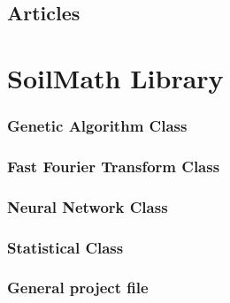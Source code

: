 \documentclass[11pt,fleqn]{book} %
\begin{document}
\section*{Articles}
\printbibliography[heading=bibempty,type=article]


\cleardoublepage
{}
\setlength{\columnsep}{0.75cm}
\printindex


\newpage
\onecolumn
\appendix
\chapter{SoilMath Library}
\subsection{Genetic Algorithm Class}

\newpage

\newpage
\subsection{Fast Fourier Transform Class}

\newpage

\newpage
\subsection{Neural Network Class}

\newpage

\newpage
\subsection{Statistical Class}

\newpage

\newpage
\subsection{General project file}

\newpage

\newpage

\newpage

\newpage

\newpage

\newpage

\end{document}
